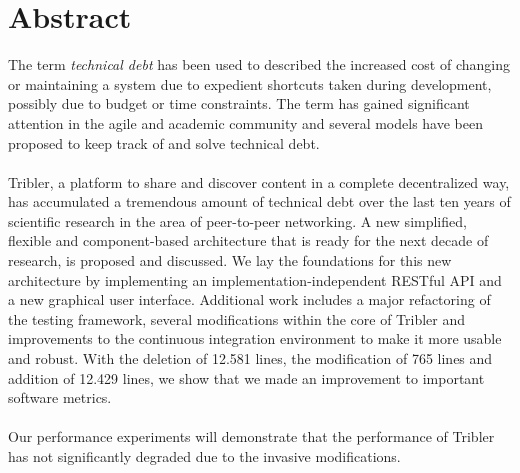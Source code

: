 \chapter*{Abstract}
The term \emph{technical debt} has been used to described the increased cost of changing or maintaining a system due to expedient shortcuts taken during development, possibly due to budget or time constraints. The term has gained significant attention in the agile and academic community and several models have been proposed to keep track of and solve technical debt.\\\\
Tribler, a platform to share and discover content in a complete decentralized way, has accumulated a tremendous amount of technical debt over the last ten years of scientific research in the area of peer-to-peer networking.
A new simplified, flexible and component-based architecture that is ready for the next decade of research, is proposed and discussed.
We lay the foundations for this new architecture by implementing an implementation-independent RESTful API and a new graphical user interface.
Additional work includes a major refactoring of the testing framework, several modifications within the core of Tribler and improvements to the continuous integration environment to make it more usable and robust.
With the deletion of 12.581 lines, the modification of 765 lines and addition of 12.429 lines, we show that we made an improvement to important software metrics.\\\\
Our performance experiments will demonstrate that the performance of Tribler has not significantly degraded due to the invasive modifications.